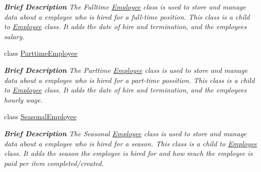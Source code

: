 \begin{DoxyCompactItemize}
\begin{DoxyCompactList}\small\item\em {\bfseries Brief Description} The Fulltime \hyperlink{class_all_employees_1_1_employee}{Employee} class is used to store and manage data about a employee who is hired for a full-\/time position. This class is a child to \hyperlink{class_all_employees_1_1_employee}{Employee} class. It adds the date of hire and termination, and the employees salary. \end{DoxyCompactList}\item 
class \hyperlink{class_all_employees_1_1_parttime_employee}{Parttime\+Employee}
\begin{DoxyCompactList}\small\item\em {\bfseries Brief Description} The Parttime \hyperlink{class_all_employees_1_1_employee}{Employee} class is used to store and manage data about a employee who is hired for a part-\/time possition. This class is a child to \hyperlink{class_all_employees_1_1_employee}{Employee} class. It adds the date of hire and termination, and the employees hourly wage. \end{DoxyCompactList}\item 
class \hyperlink{class_all_employees_1_1_seasonal_employee}{Seasonal\+Employee}
\begin{DoxyCompactList}\small\item\em {\bfseries Brief Description} The Seasonal \hyperlink{class_all_employees_1_1_employee}{Employee} class is used to store and manage data about a employee who is hired for a season. This class is a child to \hyperlink{class_all_employees_1_1_employee}{Employee} class. It adds the season the employee is hired for and how much the employee is paid per item completed/created. \end{DoxyCompactList}\end{DoxyCompactItemize}
